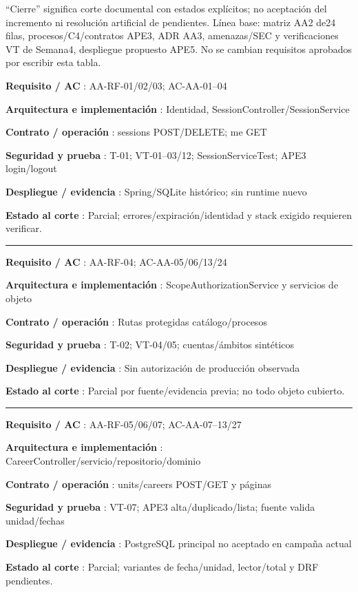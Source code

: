 \documentclass[12pt,a4paper]{report}
\begin{document}
``Cierre'' significa corte documental con estados explícitos; no
aceptación del incremento ni resolución artificial de pendientes. Línea
base: matriz AA2 de24 filas, procesos/C4/contratos APE3, ADR AA3,
amenazas/SEC y verificaciones VT de Semana4, despliegue propuesto APE5.
No se cambian requisitos aprobados por escribir esta tabla.

\textbf{Requisito / AC }: AA-RF-01/02/03; AC-AA-01--04

\textbf{Arquitectura e implementación }: Identidad,
SessionController/SessionService

\textbf{Contrato / operación }: sessions POST/DELETE; me GET

\textbf{Seguridad y prueba }: T-01; VT-01--03/12; SessionServiceTest;
APE3 login/logout

\textbf{Despliegue / evidencia }: Spring/SQLite histórico; sin runtime
nuevo

\textbf{Estado al corte }: Parcial; errores/expiración/identidad y stack
exigido requieren verificar.

\medskip\hrule\medskip

\textbf{Requisito / AC }: AA-RF-04; AC-AA-05/06/13/24

\textbf{Arquitectura e implementación }: ScopeAuthorizationService y
servicios de objeto

\textbf{Contrato / operación }: Rutas protegidas catálogo/procesos

\textbf{Seguridad y prueba }: T-02; VT-04/05; cuentas/ámbitos sintéticos

\textbf{Despliegue / evidencia }: Sin autorización de producción
observada

\textbf{Estado al corte }: Parcial por fuente/evidencia previa; no todo
objeto cubierto.

\medskip\hrule\medskip

\textbf{Requisito / AC }: AA-RF-05/06/07; AC-AA-07--13/27

\textbf{Arquitectura e implementación
}: CareerController/servicio/repositorio/dominio

\textbf{Contrato / operación }: units/careers POST/GET y páginas

\textbf{Seguridad y prueba }: VT-07; APE3 alta/duplicado/lista; fuente
valida unidad/fechas

\textbf{Despliegue / evidencia }: PostgreSQL principal no aceptado en
campaña actual

\textbf{Estado al corte }: Parcial; variantes de fecha/unidad,
lector/total y DRF pendientes.
\end{document}
